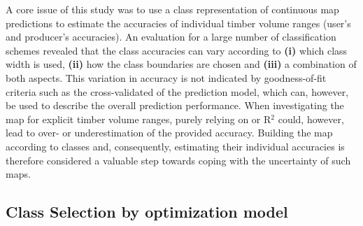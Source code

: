 A core issue of this study was to use a class representation of continuous map predictions to estimate the accuracies of individual timber volume ranges (user's and producer's accuracies). An evaluation for a large number of classification schemes revealed that the class accuracies can vary according to \textbf{(i)} which class width is used, \textbf{(ii)} how the class boundaries are chosen and \textbf{(iii)} a combination of both aspects. This variation in accuracy is not indicated by goodness-of-fit criteria such as the cross-validated \rmsecv{} of the prediction model, which can, however, be used to describe the overall prediction performance. When investigating the map for explicit timber volume ranges, purely relying on \rmsecv{} or R$^2$ could, however, lead to over- or underestimation of the provided accuracy. Building the map according to classes and, consequently, estimating their individual accuracies is therefore considered a valuable step towards coping with the uncertainty of such maps.

\subsection{Class Selection by optimization model}
\label{sec:cspmod}

